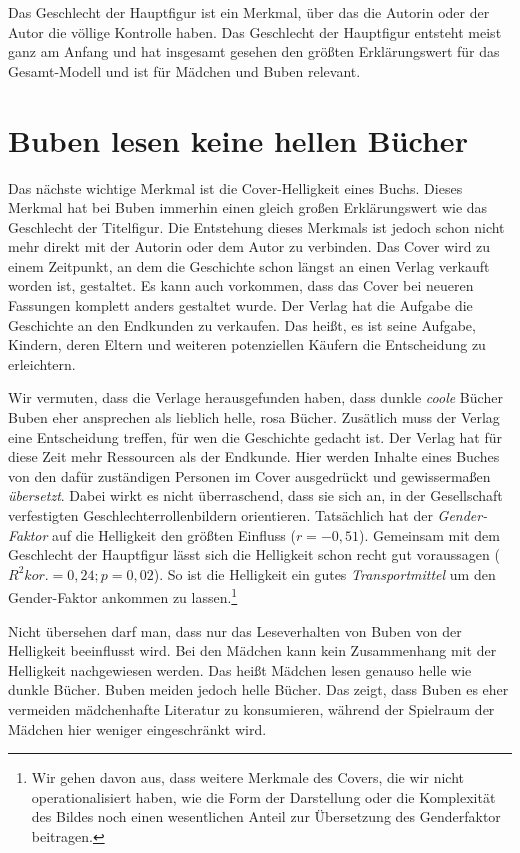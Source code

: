 Das Geschlecht der Hauptfigur ist ein Merkmal, über das die Autorin oder
der Autor die völlige Kontrolle haben. Das Geschlecht der Hauptfigur
entsteht meist ganz am Anfang und hat insgesamt gesehen den größten
Erklärungswert für das Gesamt-Modell und ist für Mädchen und Buben
relevant.

\section{Buben lesen keine hellen Bücher}

Das nächste wichtige Merkmal ist die Cover-Helligkeit eines Buchs.
Dieses Merkmal hat bei Buben immerhin einen gleich großen Erklärungswert
wie das Geschlecht der Titelfigur. Die Entstehung dieses Merkmals ist
jedoch schon nicht mehr direkt mit der Autorin oder dem Autor zu
verbinden. Das Cover wird zu einem Zeitpunkt, an dem die Geschichte
schon längst an einen Verlag verkauft worden ist, gestaltet. Es kann
auch vorkommen, dass das Cover bei neueren Fassungen komplett anders
gestaltet wurde. Der Verlag hat die Aufgabe die Geschichte an den
Endkunden zu verkaufen. Das heißt, es ist seine Aufgabe, Kindern, deren
Eltern und weiteren potenziellen Käufern die Entscheidung zu
erleichtern.

Wir vermuten, dass die Verlage herausgefunden haben, dass dunkle
\emph{coole} Bücher Buben eher ansprechen als lieblich helle, rosa
Bücher. Zusätlich muss der Verlag eine Entscheidung treffen, für wen die
Geschichte gedacht ist. Der Verlag hat für diese Zeit mehr Ressourcen
als der Endkunde. Hier werden Inhalte eines Buches von den dafür
zuständigen Personen im Cover ausgedrückt und gewissermaßen
\emph{übersetzt}. Dabei wirkt es nicht überraschend, dass sie sich an,
in der Gesellschaft verfestigten Geschlechterrollenbildern orientieren.
Tatsächlich hat der \emph{Gender-Faktor} auf die Helligkeit den größten
Einfluss ($r=-0{,}51$). Gemeinsam mit dem Geschlecht der Hauptfigur
lässt sich die Helligkeit schon recht gut voraussagen
($R^2 \scriptstyle kor.\textstyle =0{,}24; p=0{,}02$). So ist die
Helligkeit ein gutes \emph{Transportmittel} um den Gender-Faktor
ankommen zu
lassen.\footnote{Wir gehen davon aus, dass weitere Merkmale des Covers, die wir nicht operationalisiert haben, wie die Form der Darstellung oder die Komplexität des Bildes noch einen wesentlichen Anteil zur Übersetzung des Genderfaktor beitragen.}

Nicht übersehen darf man, dass nur das Leseverhalten von Buben von der
Helligkeit beeinflusst wird. Bei den Mädchen kann kein Zusammenhang mit
der Helligkeit nachgewiesen werden. Das heißt Mädchen lesen genauso
helle wie dunkle Bücher. Buben meiden jedoch helle Bücher. Das zeigt,
dass Buben es eher vermeiden mädchenhafte Literatur zu konsumieren,
während der Spielraum der Mädchen hier weniger eingeschränkt wird.

